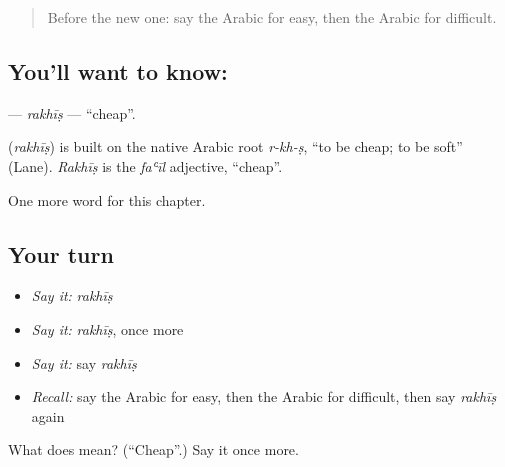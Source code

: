 \begin{quote}
Before the new one: say the Arabic for easy, then the Arabic for difficult.
\end{quote}

\subsection*{You'll want to know: }
\textbf{} — \emph{rakhīṣ} — \textquotedblleft{}cheap\textquotedblright{}.

\begin{cousinweb}
\textbf{} (\emph{rakhīṣ}) is built on the native Arabic root \emph{r-kh-ṣ}, \textquotedblleft{}to be cheap; to be soft\textquotedblright{} (Lane). \emph{Rakhīṣ} is the \emph{faʿīl} adjective, \textquotedblleft{}cheap\textquotedblright{}.
\end{cousinweb}

\begin{grammarlens}[title={What you've built}]
One more word for this chapter.
\end{grammarlens}

\subsection*{Your turn}
\begin{itemize}
\raggedright
  \item \emph{Say it:} \emph{rakhīṣ}
  \item \emph{Say it:} \emph{rakhīṣ}, once more
  \item \emph{Say it:} say \emph{rakhīṣ}
  \item \emph{Recall:} say the Arabic for easy, then the Arabic for difficult, then say \emph{rakhīṣ} again
\end{itemize}

\begin{tcolorbox}[breakable,colback=teal!4,colframe=teal!35!black,title={Before you move on}]
What does  mean? (\textquotedblleft{}Cheap\textquotedblright{}.) Say it once more.
\end{tcolorbox}
